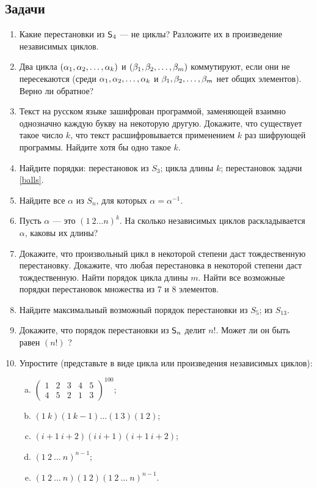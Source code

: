 \subsection*{Задачи}


\begin{enumerate}
\item Какие перестановки из ${\mathsf{S}}_4$ --- не циклы? Разложите их в произведение независимых циклов.

\item Два цикла $(\alpha_1 , \alpha_2 , \dots , \alpha_k)$ и $(\beta_1, \beta_2 ,\dots , \beta_m)$ коммутируют, если
они не пересекаются (среди $\alpha_1 , \alpha_2 , \dots , \alpha_k$ и $\beta_1, \beta_2 ,\dots , \beta_m$ нет общих элементов). Верно ли обратное?


\item Текст на русском языке зашифрован программой, заменяющей взаимно однозначно каждую
букву на некоторую другую.
\ipunkt
Докажите, что существует такое число $k$, что текст
расшифровывается применением $k$ раз шифрующей программы.
\ipunkt
Найдите хотя бы одно такое $k$.


\item Найдите порядки: \ipunkt перестановок из $S_3$; \ipunkt цикла длины $k$; \ipunkt перестановок задачи \ref{balls}.

\item Найдите все $\alpha$ из $S_n$, для которых $\alpha=\alpha^{-1}$.

\item Пусть $\alpha$ --- это $(1\ 2 \dots n)^k$.
На сколько независимых циклов раскладывается $\alpha$, каковы их длины?

\item \ipunkt Докажите, что произвольный цикл в некоторой степени даст
тождественную перестановку. \ipunkt Докажите, что любая перестановка в некоторой степени даст тождественную.
\ipunkt Найти порядок цикла длины $m$.
\ipunkt Найти все возможные порядки перестановок множества из 7 и 8 элементов.
\item Найдите максимальный возможный порядок перестановки
\ipunkt из $S_5$; \ipunkt из $S_{13}$.

\item Докажите, что порядок перестановки из ${\mathsf{S}}_n$ делит $n!$. Может ли он быть равен $(n!)$ ?

\item Упростите (представьте в виде цикла или произведения независимых циклов):
\begin{enumerate}[a)]
\item $\begin{pmatrix}1&2&3&4&5\\4&5&2&1&3\end{pmatrix}^{100};$
\item $(1\ k)(1\ k-1)\ldots (1\ 3)(1\ 2)$;
\item $(i+1\ i+2)(i\ i+1)(i+1\ i+2)$;
\item $(1\ 2\ \ldots\ n)^{n-1}$;
\item $(1\ 2\ \ldots\ n)(1\ 2)(1\ 2\ \ldots\ n)^{n-1}$.
\end{enumerate}


\end{enumerate}
